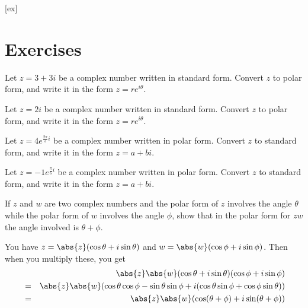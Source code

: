 [ex]
\section*{Exercises}

\begin{enumialphparenastyle}

\begin{ex} Let $z = 3 + 3i$ be a complex number written in standard form. Convert $z$ to polar form, and write it in the form $z = re^{i\theta}$.
\end{ex}

\begin{ex} Let $z = 2i$ be a complex number written in standard form. Convert $z$ to polar form, and write it in the form $z = re^{i\theta}$.
\end{ex}

\begin{ex} Let $z = 4e^{\frac{2\pi}{3}i}$ be a complex number written in polar form. Convert $z$ to standard form, and write it in the form $z = a+bi$.
\end{ex}

\begin{ex} Let $z = -1e^{\frac{\pi}{6}i}$ be a complex number written in polar form. Convert $z$ to standard form, and write it in the form $z = a+bi$.
\end{ex}

\begin{ex} If $z$ and $w$ are two complex numbers and the polar form of $z$
involves the angle $\theta $ while the polar form of $w$ involves the angle 
$\phi$, show that in the polar form for $zw$ the angle involved is $\theta
+\phi$. 
\begin{sol}
 You have $z=\abs{z}(\cos
\theta +i\sin \theta) $ and $w=\abs{w}(\cos
\phi +i\sin \phi)$. Then when you multiply these, you get
\begin{eqnarray*}
&&\abs{z}\abs{w}(\cos \theta +i\sin
\theta) (\cos \phi +i\sin \phi) \\
&=&\abs{z}\abs{w}(\cos \theta \cos
\phi -\sin \theta \sin \phi +i(\cos \theta \sin \phi +\cos \phi \sin
\theta)) \\
&=&\abs{z}\abs{w}(\cos (\theta
+\phi) +i\sin (\theta +\phi))
\end{eqnarray*}
\end{sol}
\end{ex}

\end{enumialphparenastyle}